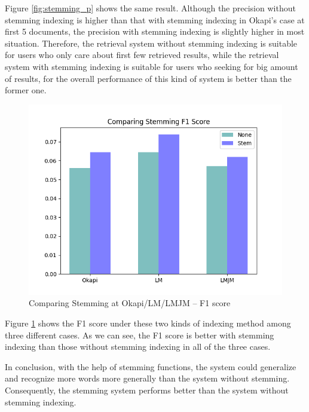 \documentclass[10pt, a4paper]{article}
\begin{document}
Figure \ref{fig:stemming_p} shows the same result. Although the precision without stemming indexing is higher than that with stemming indexing in Okapi's case at first 5 documents, the precision with stemming indexing is slightly higher in most situation. Therefore, the retrieval system without stemming indexing is suitable for users who only care about first few retrieved results, while the retrieval system with stemming indexing is suitable for users who seeking for big amount of results, for the overall performance of this kind of system is better than the former one.

\begin{figure}[h!]
\centering
\includegraphics[scale=0.4]{compare stem/Comparing Stemming F1 Score.png}
\caption{Comparing Stemming at Okapi/LM/LMJM -- F1 score}
\label{fig:stemming_f}
\end{figure}
Figure \ref{fig:stemming_f} shows the F1 score under these two kinds of indexing method among three different cases. As we can see, the F1 score is better with stemming indexing than those without stemming indexing in all of the three cases.

In conclusion, with the help of stemming functions, the system could generalize and recognize more words more generally than the system without stemming. Consequently, the stemming system performs better than the system without stemming indexing.
\end{document}
